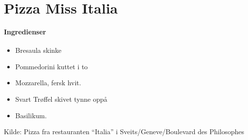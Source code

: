 \section{﻿Pizza Miss Italia}


\paragraph{Ingredienser}
\begin{itemize}[noitemsep]
	\item Bresaula skinke
	\item Pommedorini kuttet i to
	\item Mozzarella, fersk hvit.
	\item Svart Trøffel skivet tynne oppå
	\item Basilikum.
\end{itemize}




Kilde: Pizza fra restauranten “Italia” i Sveits/Geneve/Boulevard des Philosophes

